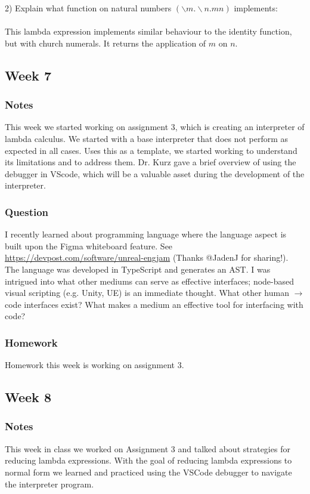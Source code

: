 \documentclass{article}
\theoremstyle{theorem}
\theoremstyle{definition}
\theoremstyle{remark}
\begin{document}
2) Explain what function on natural numbers $(\backslash m. \backslash n. m n)$ implements:\\
\\This lambda expression implements similar behaviour to the identity function, but with church numerals. It returns the application of $m$ on $n$.

\subsection{Week 7}

\subsubsection*{Notes} This week we started working on assignment 3, which is creating an interpreter of lambda calculus. We started with a base interpreter that does not perform as expected in all cases. Uses this as a template, we started working to understand its limitations and to address them. Dr. Kurz gave a brief overview of using the debugger in VScode, which will be a valuable asset during the development of the interpreter. 

\subsubsection*{Question} I recently learned about programming language where the language aspect is built upon the Figma whiteboard feature. See \url{https://devpost.com/software/unreal-engjam} (Thanks @JadenJ for sharing!). The language was developed in TypeScript and generates an AST. I was intrigued into what other mediums can serve as effective interfaces; node-based visual scripting (e.g. Unity, UE) is an immediate thought. What other human $\rightarrow$ code interfaces exist? What makes a medium an effective tool for interfacing with code?

\subsubsection*{Homework}

Homework this week is working on assignment 3.

\subsection{Week 8}

\subsubsection*{Notes} This week in class we worked on Assignment 3 and talked about strategies for reducing lambda expressions. With the goal of reducing lambda expressions to normal form we learned and practiced using the VSCode debugger to navigate the interpreter program.
\end{document}
